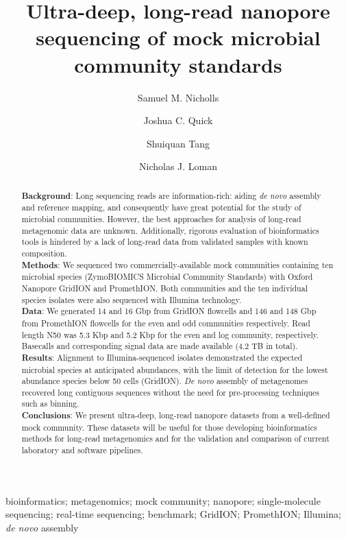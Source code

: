 \documentclass[a4paper,num-refs]{oup-contemporary}
\title{Ultra-deep, long-read nanopore sequencing of mock microbial community standards}
\author[1\authfn{2}]{Samuel M. Nicholls}
\author[1\authfn{2}]{Joshua C. Quick}
\author[2]{Shuiquan Tang}
\author[1\authfn{1}]{Nicholas J. Loman}
\affil[1]{Institute of Microbiology and Infection, School of Biosciences, University of Birmingham, UK}
\affil[2]{Zymo Research Corporation, Irvine, California, USA}
\begin{document}
\begin{frontmatter}
\maketitle
\begin{abstract}
\textbf{Background}: 
Long sequencing reads are information-rich: aiding \textit{de novo} assembly and reference mapping, and consequently have great potential for the study of microbial communities. However, the best approaches for analysis of long-read metagenomic data are unknown. Additionally, rigorous evaluation of bioinformatics tools is hindered by a lack of long-read data from validated samples with known composition.  \\
\textbf{Methods}: We sequenced two commercially-available mock communities containing ten microbial species (ZymoBIOMICS Microbial Community Standards) with Oxford Nanopore GridION and PromethION. Both communities and the ten individual species isolates were also sequenced with Illumina technology. \\
\textbf{Data}: We generated 14 and 16 Gbp from GridION flowcells and 146 and 148 Gbp from PromethION flowcells for the even and odd communities respectively. Read length N50 was 5.3 Kbp and 5.2 Kbp for the even and log community, respectively. Basecalls and corresponding signal data are made available (4.2 TB in total).
\\
\textbf{Results}: Alignment to Illumina-sequenced isolates demonstrated the expected microbial species at anticipated abundances, with the limit of detection for the lowest abundance species below 50 cells (GridION). \textit{De novo} assembly of metagenomes recovered long contiguous sequences without the need for pre-processing techniques such as binning.
\\
\textbf{Conclusions}: We present ultra-deep, long-read nanopore datasets from a well-defined mock community. These datasets will be useful for those developing bioinformatics methods for long-read metagenomics and for the validation and comparison of current laboratory and software pipelines. 

\end{abstract}
\begin{keywords}
bioinformatics; metagenomics; mock community; nanopore; single-molecule sequencing; real-time sequencing; benchmark; GridION; PromethION; Illumina; \textit{de novo} assembly
\end{keywords}
\end{frontmatter}
\end{document}

